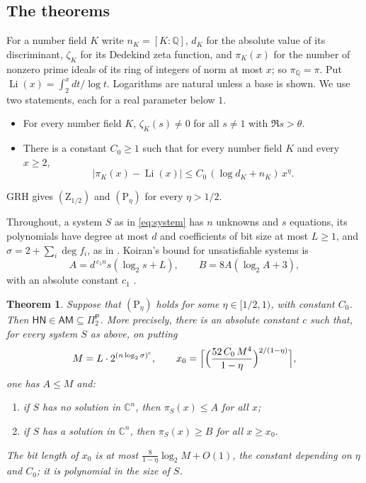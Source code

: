 \documentclass[11pt]{amsart}
\newtheorem{theorem}{Theorem}
\theoremstyle{definition}
\theoremstyle{remark}
\newcommand{\Q}{\mathbb Q}
\newcommand{\C}{\mathbb C}
\newcommand{\cl}[1]{\mathsf{#1}}
\newcommand{\HN}{\cl{HN}}
\newcommand{\AM}{\cl{AM}}
\newcommand{\Pitwo}{\Pi_2^{\cl P}}
\newcommand{\Zh}[1]{(\mathrm Z_{#1})}
\newcommand{\Ph}[1]{(\mathrm P_{#1})}
\newcommand{\Li}{\operatorname{Li}}
\begin{document}
\subsection{The theorems}
For a number field $K$ write $n_K=[K:\Q]$, $d_K$ for the absolute value of its discriminant, $\zeta_K$ for its Dedekind zeta function, and $\pi_K(x)$ for the number of nonzero prime ideals of its ring of integers of norm at most $x$; so $\pi_\Q=\pi$. Put $\Li(x)=\int_2^x dt/\log t$. Logarithms are natural unless a base is shown. We use two statements, each for a real parameter below $1$.
\begin{itemize}
\item[$\Zh\theta$] For every number field $K$, $\zeta_K(s)\ne0$ for all $s\ne1$ with $\Re s>\theta$.
\item[$\Ph\eta$] There is a constant $C_0\ge1$ such that for every number field $K$ and every $x\ge2$,
\[
 \bigl|\pi_K(x)-\Li(x)\bigr|\le C_0\,(\log d_K+n_K)\,x^{\eta}.
\]
\end{itemize}
GRH gives $\Zh{1/2}$ and $\Ph\eta$ for every $\eta>1/2$.

Throughout, a system $S$ as in \eqref{eq:system} has $n$ unknowns and $s$ equations, its polynomials have degree at most $d$ and coefficients of bit size at most $L\ge1$, and $\sigma=2+\sum_i\deg f_i$, as in \cite[\S1.1]{K96}. Koiran's bound for unsatisfiable systems is
\begin{equation}\label{eq:A}
 A=d^{\,c_1n}s(\log_2s+L),\qquad B=8A(\log_2A+3),
\end{equation}
with an absolute constant $c_1$ \cite[Theorem~1]{K96}.

\begin{theorem}\label{thmA}
Suppose that $\Ph\eta$ holds for some $\eta\in[1/2,1)$, with constant $C_0$. Then $\HN\in\AM\subseteq\Pitwo$. More precisely, there is an absolute constant $c$ such that, for every system $S$ as above, on putting
\[
 M=L\cdot2^{(n\log_2\sigma)^{c}},\qquad
 x_0=\Bigl\lceil\Bigl(\frac{52\,C_0\,M^4}{1-\eta}\Bigr)^{2/(1-\eta)}\Bigr\rceil ,
\]
one has $A\le M$ and:
\begin{enumerate}
\item if $S$ has no solution in $\C^n$, then $\pi_S(x)\le A$ for all $x$;
\item if $S$ has a solution in $\C^n$, then $\pi_S(x)\ge B$ for all $x\ge x_0$.
\end{enumerate}
The bit length of $x_0$ is at most $\frac{8}{1-\eta}\log_2M+O(1)$, the constant depending on $\eta$ and $C_0$; it is polynomial in the size of $S$.
\end{theorem}
\end{document}
